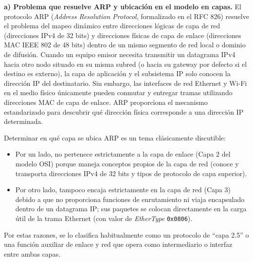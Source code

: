 \documentclass[12pt,a4paper]{article}
\begin{document}
\textbf{a) Problema que resuelve ARP y ubicación en el modelo en capas.}
El protocolo ARP (\emph{Address Resolution Protocol}, formalizado en el RFC 826) resuelve el problema del mapeo dinámico entre direcciones lógicas de capa de red (direcciones IPv4 de 32 bits) y direcciones físicas de capa de enlace (direcciones MAC IEEE 802 de 48 bits) dentro de un mismo segmento de red local o dominio de difusión. Cuando un equipo emisor necesita transmitir un datagrama IPv4 hacia otro nodo situado en su misma subred (o hacia su gateway por defecto si el destino es externo), la capa de aplicación y el subsistema IP solo conocen la dirección IP del destinatario. Sin embargo, las interfaces de red Ethernet y Wi-Fi en el medio físico únicamente pueden conmutar y entregar tramas utilizando direcciones MAC de capa de enlace. ARP proporciona el mecanismo estandarizado para descubrir qué dirección física corresponde a una dirección IP determinada.

Determinar en qué capa se ubica ARP es un tema clásicamente discutible:
\begin{itemize}
    \item Por un lado, no pertenece estrictamente a la capa de enlace (Capa 2 del modelo OSI) porque maneja conceptos propios de la capa de red (conoce y transporta direcciones IPv4 de 32 bits y tipos de protocolo de capa superior).
    \item Por otro lado, tampoco encaja estrictamente en la capa de red (Capa 3) debido a que no proporciona funciones de enrutamiento ni viaja encapsulado dentro de un datagrama IP; sus paquetes se colocan directamente en la carga útil de la trama Ethernet (con valor de \emph{EtherType} \texttt{0x0806}).
\end{itemize}
Por estas razones, se lo clasifica habitualmente como un protocolo de ``capa 2.5'' o una función auxiliar de enlace y red que opera como intermediario o interfaz entre ambas capas.
\end{document}
